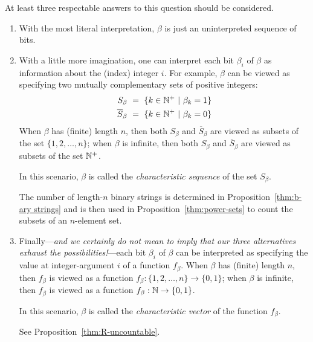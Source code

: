 \noindent
At least three respectable answers to this question should be considered.
\begin{enumerate}
\item
With the most literal interpretation, $\beta$ is just an uninterpreted sequence of bits.

\medskip\item
With a little more imagination, one can interpret each bit $\beta_i$ of $\beta$ as information about the (index) integer $i$.  For example, $\beta$ can be viewed as specifying two mutually complementary sets of positive integers:
\begin{eqnarray*}
S_\beta \ = \ \{ k \in \mathbb{N}^+ \ | \ \beta_k = 1\} \\
\overline{S}_\beta \ = \ \{ k \in \mathbb{N}^+ \ | \ \beta_k = 0\}
\end{eqnarray*}
When $\beta$ has (finite) length $n$, then both $S_\beta$ and $\overline{S}_\beta$ are viewed as subsets of the set $\{1, 2, \ldots, n\}$; when $\beta$ is infinite, then both $S_\beta$ and $\overline{S}_\beta$ are viewed as subsets of the set $\mathbb{N}^+$.

\smallskip

In this scenario, $\beta$ is called the {\it characteristic sequence} of the set $S_\beta$.


\medskip


\smallskip

The number of length-$n$ binary strings is determined in Proposition~\ref{thm:b-ary strings} and is then used in Proposition~\ref{thm:power-sets} to count the subsets of an $n$-element set.

\medskip\item
Finally---{\em and we certainly do not mean to imply that our three alternatives exhaust the possibilities!}---each bit $\beta_i$ of $\beta$ can be interpreted as specifying the value at integer-argument $i$ of a function $f_\beta$.  When $\beta$ has (finite) length $n$, then $f_\beta$ is viewed as a function $f_\beta: \{1, 2, \ldots, n\} \rightarrow \{0,1\}$; when $\beta$ is infinite, then $f_\beta$ is viewed as a function $f_\beta: \mathbb{N} \rightarrow \{0,1\}$.

\smallskip

In this scenario, $\beta$ is called the {\it characteristic vector} of the function $f_\beta$.

\medskip

  See Proposition~\ref{thm:R-uncountable}.
\end{enumerate}

